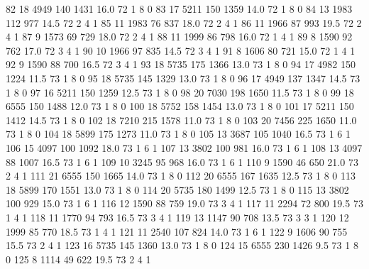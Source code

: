 \documentclass{article}
\begin{document}
\begin{Schunk}
\begin{Soutput}
82       18  4949 140 1431 16.0  72      1       8        0
83       17  5211 150 1359 14.0  72      1       8        0
84       13  1983 112  977 14.5  72      2       4        1
85       11  1983  76  837 18.0  72      2       4        1
86       11  1966  87  993 19.5  72      2       4        1
87        9  1573  69  729 18.0  72      2       4        1
88       11  1999  86  798 16.0  72      1       4        1
89        8  1590  92  762 17.0  72      3       4        1
90       10  1966  97  835 14.5  72      3       4        1
91        8  1606  80  721 15.0  72      1       4        1
92        9  1590  88  700 16.5  72      3       4        1
93       18  5735 175 1366 13.0  73      1       8        0
94       17  4982 150 1224 11.5  73      1       8        0
95       18  5735 145 1329 13.0  73      1       8        0
96       17  4949 137 1347 14.5  73      1       8        0
97       16  5211 150 1259 12.5  73      1       8        0
98       20  7030 198 1650 11.5  73      1       8        0
99       18  6555 150 1488 12.0  73      1       8        0
100      18  5752 158 1454 13.0  73      1       8        0
101      17  5211 150 1412 14.5  73      1       8        0
102      18  7210 215 1578 11.0  73      1       8        0
103      20  7456 225 1650 11.0  73      1       8        0
104      18  5899 175 1273 11.0  73      1       8        0
105      13  3687 105 1040 16.5  73      1       6        1
106      15  4097 100 1092 18.0  73      1       6        1
107      13  3802 100  981 16.0  73      1       6        1
108      13  4097  88 1007 16.5  73      1       6        1
109      10  3245  95  968 16.0  73      1       6        1
110       9  1590  46  650 21.0  73      2       4        1
111      21  6555 150 1665 14.0  73      1       8        0
112      20  6555 167 1635 12.5  73      1       8        0
113      18  5899 170 1551 13.0  73      1       8        0
114      20  5735 180 1499 12.5  73      1       8        0
115      13  3802 100  929 15.0  73      1       6        1
116      12  1590  88  759 19.0  73      3       4        1
117      11  2294  72  800 19.5  73      1       4        1
118      11  1770  94  793 16.5  73      3       4        1
119      13  1147  90  708 13.5  73      3       3        1
120      12  1999  85  770 18.5  73      1       4        1
121      11  2540 107  824 14.0  73      1       6        1
122       9  1606  90  755 15.5  73      2       4        1
123      16  5735 145 1360 13.0  73      1       8        0
124      15  6555 230 1426  9.5  73      1       8        0
125       8  1114  49  622 19.5  73      2       4        1

\end{Soutput}
\end{Schunk}
\end{document}
